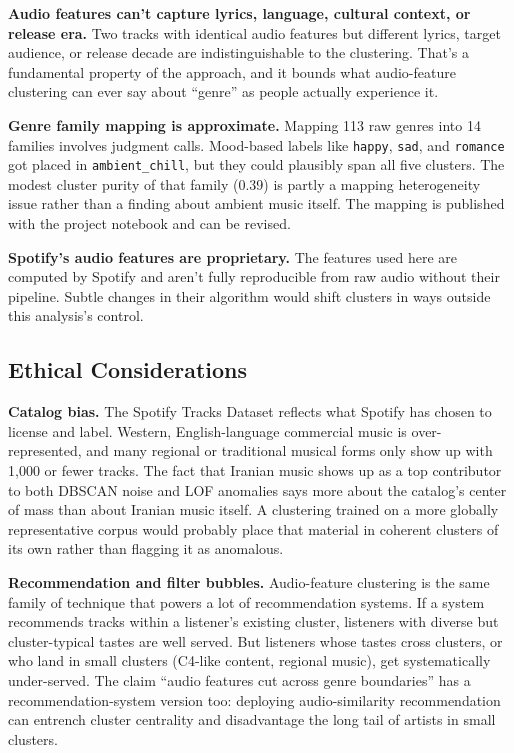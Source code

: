 \documentclass[10pt,twocolumn]{article}
\begin{document}
\textbf{Audio features can't capture lyrics, language, cultural context, or release era.} Two tracks with identical audio features but different lyrics, target audience, or release decade are indistinguishable to the clustering. That's a fundamental property of the approach, and it bounds what audio-feature clustering can ever say about ``genre'' as people actually experience it.

\textbf{Genre family mapping is approximate.} Mapping 113 raw genres into 14 families involves judgment calls. Mood-based labels like \texttt{happy}, \texttt{sad}, and \texttt{romance} got placed in \texttt{ambient\_chill}, but they could plausibly span all five clusters. The modest cluster purity of that family (0.39) is partly a mapping heterogeneity issue rather than a finding about ambient music itself. The mapping is published with the project notebook and can be revised.

\textbf{Spotify's audio features are proprietary.} The features used here are computed by Spotify and aren't fully reproducible from raw audio without their pipeline. Subtle changes in their algorithm would shift clusters in ways outside this analysis's control.

\subsection{Ethical Considerations}
\textbf{Catalog bias.} The Spotify Tracks Dataset reflects what Spotify has chosen to license and label. Western, English-language commercial music is over-represented, and many regional or traditional musical forms only show up with 1,000 or fewer tracks. The fact that Iranian music shows up as a top contributor to both DBSCAN noise and LOF anomalies says more about the catalog's center of mass than about Iranian music itself. A clustering trained on a more globally representative corpus would probably place that material in coherent clusters of its own rather than flagging it as anomalous.

\textbf{Recommendation and filter bubbles.} Audio-feature clustering is the same family of technique that powers a lot of recommendation systems. If a system recommends tracks within a listener's existing cluster, listeners with diverse but cluster-typical tastes are well served. But listeners whose tastes cross clusters, or who land in small clusters (C4-like content, regional music), get systematically under-served. The claim ``audio features cut across genre boundaries'' has a recommendation-system version too: deploying audio-similarity recommendation can entrench cluster centrality and disadvantage the long tail of artists in small clusters.
\end{document}

